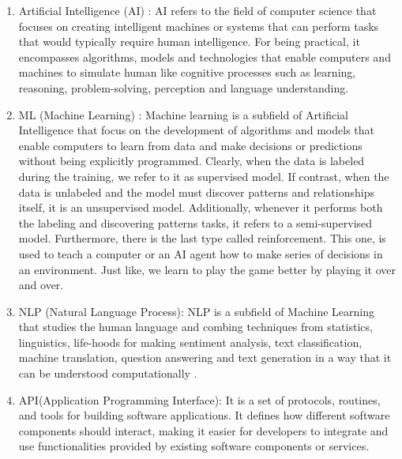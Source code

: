 \documentclass[12pt,a4paper, oneside]{book}
\begin{document}
\begin{enumerate}[label=\alph*)]
		\item Artificial Intelligence (AI) :
		 AI refers to the field of computer science that focuses on creating intelligent machines or systems that can perform tasks that would typically require human intelligence. For being practical, it encompasses algorithms, models and technologies that enable computers and machines to simulate human like cognitive processes such as learning, reasoning, problem-solving, perception and language understanding.  
		 
		 \item ML (Machine Learning)  : 
		 Machine learning is a subfield of Artificial Intelligence that focus on the development of algorithms and models that enable computers to learn from data and make decisions or predictions without being explicitly programmed\citep{smola2010introduction}. Clearly, when the data is labeled during the training, we refer to it as supervised model. If contrast, when the data is unlabeled and the model must discover patterns and relationships itself, it is an unsupervised model. Additionally, whenever it performs both the labeling  and discovering patterns tasks, it refers to a semi-supervised model. Furthermore, there is the last type called reinforcement. This one, is used to teach a computer or an AI agent how to make series of decisions in an environment. Just like, we learn to play the game better by playing it over and over.   
		 
		 \item NLP (Natural Language Process):
		 NLP is a subfield of Machine Learning that studies the human language and combing techniques from statistics, linguistics, life-hoods for making sentiment analysis, text classification, machine translation, question answering and text generation in a way that it can be understood computationally \citep{cambria2014jumping}.  
		 
		 \item API(Application Programming Interface): It is a set of protocols, routines, and tools for building software applications. It defines how different software components should interact, making it easier for developers to integrate and use functionalities provided by existing software components or services\citep{tsai2016study}.
		  \end{enumerate}
\end{document}
